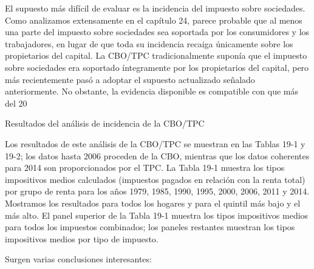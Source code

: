 \documentclass[10pt,a4paper]{article}
\begin{document}
El supuesto más difícil de evaluar es la incidencia del impuesto sobre sociedades. Como analizamos extensamente en el capítulo 24, parece probable que al menos una parte del impuesto sobre sociedades sea soportada por los consumidores y los trabajadores, en lugar de que toda su incidencia recaiga únicamente sobre los propietarios del capital. La CBO/TPC tradicionalmente suponía que el impuesto sobre sociedades era soportado íntegramente por los propietarios del capital, pero más recientemente pasó a adoptar el supuesto actualizado señalado anteriormente. No obstante, la evidencia disponible es compatible con que más del 20 %

Resultados del análisis de incidencia de la CBO/TPC

Los resultados de este análisis de la CBO/TPC se muestran en las Tablas 19-1 y 19-2; los datos hasta 2006 proceden de la CBO, mientras que los datos coherentes para 2014 son proporcionados por el TPC. La Tabla 19-1 muestra los tipos impositivos medios calculados (impuestos pagados en relación con la renta total) por grupo de renta para los años 1979, 1985, 1990, 1995, 2000, 2006, 2011 y 2014. Mostramos los resultados para todos los hogares y para el quintil más bajo y el más alto. El panel superior de la Tabla 19-1 muestra los tipos impositivos medios para todos los impuestos combinados; los paneles restantes muestran los tipos impositivos medios por tipo de impuesto.

Surgen varias conclusiones interesantes:
\end{document}
